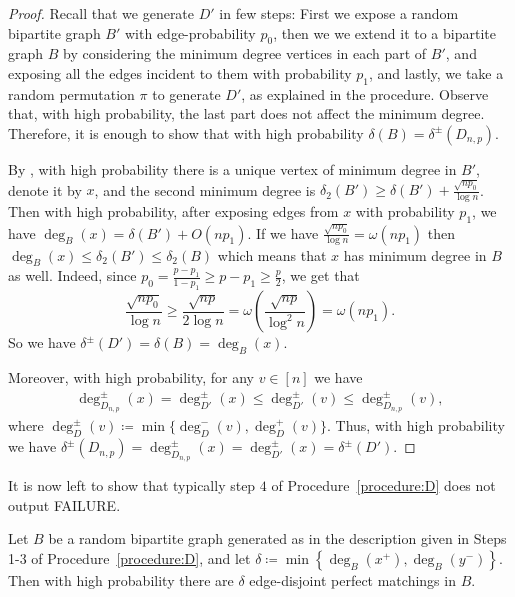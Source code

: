 \documentclass{article}
\begin{document}
	\begin{proof}
		Recall that we generate $D'$ in few steps: First we expose a random bipartite graph $B'$ with edge-probability $p_0$, then we we extend it to a bipartite graph $B$ by considering the minimum degree vertices in each part of $B'$, and exposing all the edges incident to them with probability $p_1$, and lastly, we take a random permutation $\pi$ to generate $D'$, as explained in the procedure.
		Observe that, with high probability, the last part does not affect the minimum degree.
		Therefore, it is enough to show that with high probability $\delta(B) = \delta^{\pm}\left(D_{n,p} \right)$.
		
		By , with high probability there is a unique vertex of minimum degree in $B'$, denote it by $x$, and the second minimum degree is $\delta_2(B') \ge \delta(B') + \frac{\sqrt{np_0}}{\log n}$.
		Then with high probability, after exposing edges from $x$ with probability $p_1$, we have $\deg_B(x) = \delta(B') + O(np_1)$.
		If we have $\frac{\sqrt{np_0}}{\log n} = \omega\left(np_1 \right)$ then $\deg_B(x) \le \delta_2(B') \le \delta_2(B)$ which means that $x$ has minimum degree in $B$ as well.
		Indeed, since $p_0 = \frac{p - p_1}{1 - p_1} \ge p - p_1 \ge \frac{p}{2}$, we get that
		\[\frac{\sqrt{np_0}}{\log n} \ge \frac{\sqrt{np}}{2\log n} = \omega\left(\frac{\sqrt{np}}{\log^2 n} \right) = \omega(np_1). \]
		So we have $\delta^{\pm}(D') = \delta(B) = \deg_B(x)$.
		
		Moreover, with high probability, for any $v \in [n]$ we have
		\begin{align*}
		\deg^{\pm}_{D_{n,p}}(x) = \deg^{\pm}_{D'}(x) \le \deg^{\pm}_{D'}(v) \le \deg^{\pm}_{D_{n,p}}(v),
		\end{align*}
		where $\deg^{\pm}_D(v) \coloneqq \min \{\deg^-_D(v), \deg^+_D(v)\}$.
		Thus, with high probability we have $\delta^{\pm}\left(D_{n,p} \right) = \deg^{\pm}_{D_{n,p}}(x) = \deg^{\pm}_{D'}(x) = \delta^{\pm}(D')$.
	\end{proof}
	
	
	
	It is now left to show that typically step $4$ of Procedure~\ref{procedure:D} does not output FAILURE.
	
	
	\begin{lemma}
		\label{lem:disjointPM}
		Let $B$ be a random bipartite graph generated as in the description given in Steps 1-3 of Procedure~\ref{procedure:D}, and let $\delta \coloneqq \min\left\{\deg_{B}\left(x^+ \right), \deg_{B}\left(y^- \right) \right\}$.
		Then with high probability there are $\delta$ edge-disjoint perfect matchings in $B$.
	\end{lemma}
	
\end{document}
